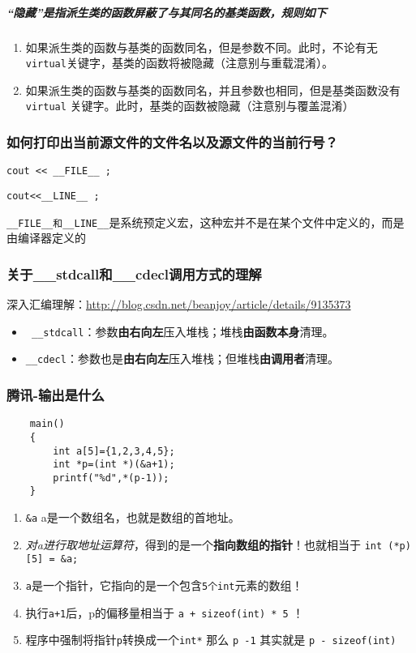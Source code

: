 \documentclass[UTF8,a4paper,8pt]{ctexart}
\begin{document}
			\subparagraph{“隐藏”是指派生类的函数屏蔽了与其同名的基类函数，规则如下}
				\begin{enumerate}
					\item 如果派生类的函数与基类的函数同名，但是参数不同。此时，不论有无\verb|virtual|关键字，基类的函数将被隐藏（注意别与重载混淆）。
					\item 如果派生类的函数与基类的函数同名，并且参数也相同，但是基类函数没有\verb|virtual| 关键字。此时，基类的函数被隐藏（注意别与覆盖混淆）
				\end{enumerate}
			
		\subsubsection{如何打印出当前源文件的文件名以及源文件的当前行号？}
				\verb|cout << __FILE__ ;|
				
				\verb|cout<<__LINE__ ;|
				
				\verb|__FILE__和__LINE__|是系统预定义宏，这种宏并不是在某个文件中定义的，而是由编译器定义的
				
		\subsubsection{关于\_\_stdcall和\_\_cdecl调用方式的理解}
			深入汇编理解：\url{http://blog.csdn.net/beanjoy/article/details/9135373}
			\begin{itemize}[itemindent = 1em]
				\item\verb| __stdcall|：参数\textbf{由右向左}压入堆栈；堆栈\textbf{由函数本身}清理。
				\item \verb|__cdecl|：参数也是\textbf{由右向左}压入堆栈；但堆栈\textbf{由调用者}清理。
			\end{itemize}
		\subsubsection{腾讯-输出是什么 }
		\begin{lstlisting}
	main()
	{
		int a[5]={1,2,3,4,5};
		int *p=(int *)(&a+1);
		printf("%d",*(p-1));
	}
		\end{lstlisting}
		
		\begin{enumerate}
			\item \verb|&a|   a是一个数组名，也就是数组的首地址。
			\item \textit{对a进行取地址运算符}，得到的是一个\textbf{指向数组的指针}！也就相当于 \verb|int (*p) [5] = &a;|
			\item \verb|a|是一个指针，它指向的是一个包含\verb|5个int|元素的数组！
			\item 执行\verb|a+1|后，p的偏移量相当于 \verb|a + sizeof(int) * 5| ！
			\item 程序中强制将指针\verb|p|转换成一个\verb|int*| 那么 \verb|p -1| 其实就是 \verb|p - sizeof(int)|
		\end{enumerate}
\newpage
\end{document}
